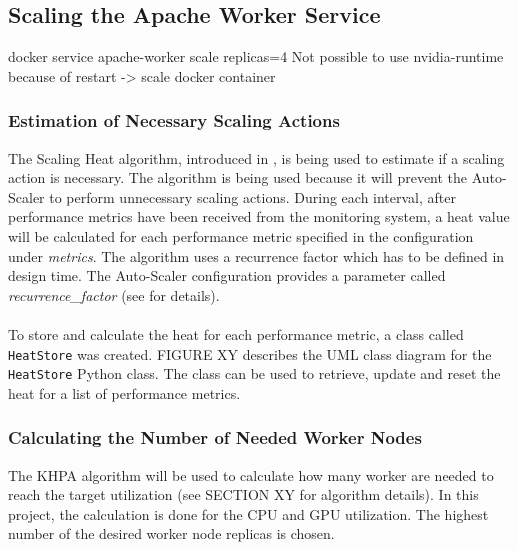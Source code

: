 \subsection{Scaling the Apache Worker Service}
docker service apache-worker scale replicas=4
Not possible to use nvidia-runtime because of restart -> scale docker container


\subsubsection{Estimation of Necessary Scaling Actions}

%
%

The Scaling Heat algorithm, introduced in , is being used to estimate if a scaling action is necessary.
The algorithm is being used because it will prevent the Auto-Scaler to perform unnecessary scaling actions.
During each interval, after performance metrics have been received from the monitoring system, a heat value will be calculated for each performance metric specified in the configuration under \textit{metrics}.
The algorithm uses a recurrence factor which has to be defined in design time. The Auto-Scaler configuration provides a parameter called \textit{recurrence\_factor} (see  for details). 


\paragraph{}To store and calculate the heat for each performance metric, a class called \texttt{HeatStore} was created.
FIGURE XY describes the UML class diagram for the \texttt{HeatStore} Python class.
The class can be used to retrieve, update and reset the heat for a list of performance metrics.


\subsubsection{Calculating the Number of Needed Worker Nodes}

%
%


The KHPA algorithm will be used to calculate how many worker are needed to reach the target utilization (see SECTION XY for algorithm details). 
In this project, the calculation is done for the CPU and GPU utilization. The highest number of the desired worker node replicas is chosen.


